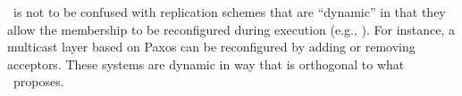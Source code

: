 \dynastar\ is not to be confused with replication schemes that are ``dynamic'' in that they allow the membership to be reconfigured during execution (e.g., \cite{birman2010dsr,guessoum2003dar,dustdar2007soc}).
For instance, a multicast layer based on Paxos can be reconfigured by adding or removing acceptors. 
These systems are dynamic in way that is orthogonal to what \dynastar\ proposes.

